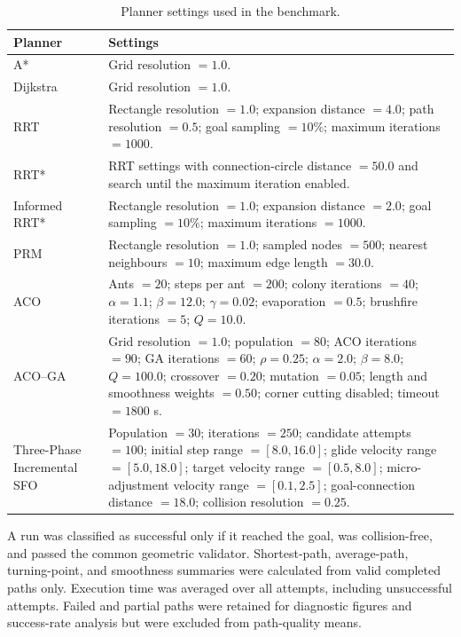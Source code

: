 \begin{table}[t]
\centering
\caption{Planner settings used in the benchmark.}
\label{tab:planner-settings}
\small
\begin{tabular}{lp{11.2cm}}
\toprule
Planner & Settings \\
\midrule
A* & Grid resolution $=1.0$. \\
Dijkstra & Grid resolution $=1.0$. \\
RRT & Rectangle resolution $=1.0$; expansion distance $=4.0$; path resolution $=0.5$; goal sampling $=10\%$; maximum iterations $=1000$. \\
RRT* & RRT settings with connection-circle distance $=50.0$ and search until the maximum iteration enabled. \\
Informed RRT* & Rectangle resolution $=1.0$; expansion distance $=2.0$; goal sampling $=10\%$; maximum iterations $=1000$. \\
PRM & Rectangle resolution $=1.0$; sampled nodes $=500$; nearest neighbours $=10$; maximum edge length $=30.0$. \\
ACO & Ants $=20$; steps per ant $=200$; colony iterations $=40$; $\alpha=1.1$; $\beta=12.0$; $\gamma=0.02$; evaporation $=0.5$; brushfire iterations $=5$; $Q=10.0$. \\
ACO--GA & Grid resolution $=1.0$; population $=80$; ACO iterations $=90$; GA iterations $=60$; $\rho=0.25$; $\alpha=2.0$; $\beta=8.0$; $Q=100.0$; crossover $=0.20$; mutation $=0.05$; length and smoothness weights $=0.50$; corner cutting disabled; timeout $=1800$ s. \\
Three-Phase Incremental SFO & Population $=30$; iterations $=250$; candidate attempts $=100$; initial step range $=[8.0,16.0]$; glide velocity range $=[5.0,18.0]$; target velocity range $=[0.5,8.0]$; micro-adjustment velocity range $=[0.1,2.5]$; goal-connection distance $=18.0$; collision resolution $=0.25$. \\
\bottomrule
\end{tabular}
\end{table}

A run was classified as successful only if it reached the goal, was
collision-free, and passed the common geometric validator. Shortest-path,
average-path, turning-point, and smoothness summaries were calculated from
valid completed paths only. Execution time was averaged over all attempts,
including unsuccessful attempts. Failed and partial paths were retained for
diagnostic figures and success-rate analysis but were excluded from path-quality
means.
